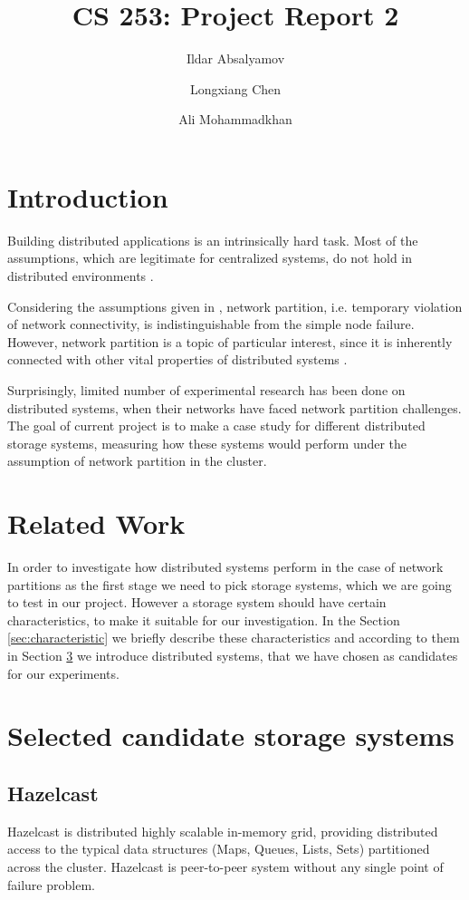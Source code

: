 \documentclass[a4paper]{article}
\title{CS 253: Project Report 2}
\author{Ildar Absalyamov \and Longxiang Chen \and Ali Mohammadkhan}
\begin{document}
\maketitle

\section{Introduction}

Building distributed applications is an intrinsically hard task.
Most of the assumptions, which are legitimate for centralized systems, do not hold in distributed environments \cite{deutsch1992eight}.

Considering the assumptions given in \cite{deutsch1992eight}, network partition, i.e. temporary violation of network connectivity, is indistinguishable from the simple node failure. 
However, network partition is a topic of particular interest, since it is inherently connected with other vital properties of distributed systems \cite{brewer2000towards}.


Surprisingly, limited number of experimental research has been done on distributed systems, when their networks have faced network partition challenges. 
The goal of current project is to make a case study for different distributed storage systems, measuring how these systems would perform under the assumption of network partition in the cluster.


\section{Related Work}

In order to investigate how distributed systems perform in the case of network partitions as the first stage we need to pick storage systems, which we are going to test in our project.
However a storage system should have certain characteristics, to make it suitable for our investigation. 
In the Section \ref{sec:characteristic} we briefly describe these characteristics and according to them in Section \ref{sec:candidates} we introduce distributed systems, that we have chosen as candidates for our experiments.

\section{Selected candidate storage systems}
\label{sec:candidates}

\subsection*{Hazelcast}
Hazelcast is distributed highly scalable in-memory grid, providing distributed access to the typical data structures (Maps, Queues, Lists, Sets) partitioned across the cluster. 
Hazelcast is peer-to-peer system without any single point of failure problem.
\end{document}
